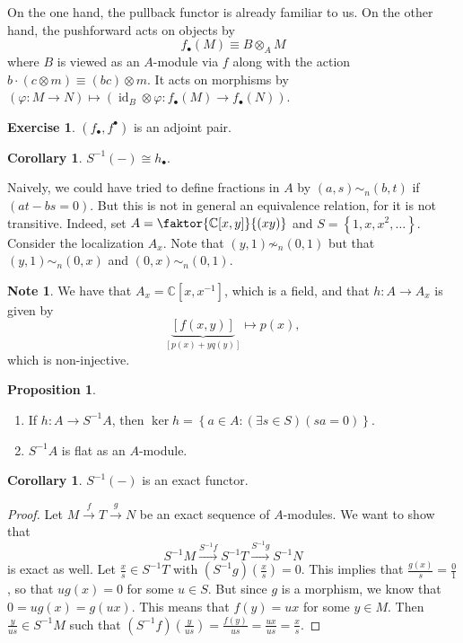 \documentclass[10pt,letterpaper,cm]{nupset}
\theoremstyle{definition}
\newtheorem{note}[definition]{Note}
\theoremstyle{theorem}
\newtheorem{prop}[definition]{Proposition}
\newtheorem{corollary}[definition]{Corollary}
\newtheorem{exercise}[definition]{Exercise}
\theoremstyle{remark}
\newcommand{\C}{\mathbb C}
\newcommand{\1}{\mathbf{1}}
\newcommand{\0}{\vec 0}
\DeclareMathOperator{\id}{id}
\begin{document}
On the one hand, the pullback functor is already familiar to us. On the other hand, the pushforward acts on objects by $$f_{\bullet}(M) \equiv B \otimes_A M$$ where $B$ is viewed as an $A$-module via $f$ along with the action $b\cdot(c \otimes m) \equiv  (bc) \otimes m$. It acts on morphisms by $\left(\varphi : M \to N\right) \mapsto \left(\id_B \otimes \varphi : f_{\bullet}(M) \to f_{\bullet}(N)\right)$. 


\begin{exercise}
$\left(f_{\bullet}, f^{\bullet}\right)$ is an adjoint pair.
\end{exercise}
\begin{corollary}
$S^{-1}(-) \cong h_{\bullet}$.
\end{corollary}

\smallskip

Naively, we could have tried to define fractions in $A$ by  $(a,s) \sim_n (b,t)$ if $(at-bs =0)$. But this is not in general an equivalence relation, for it is not transitive. Indeed, set $A = \faktor{\C[x,y]}{(xy)}$ and $S = \left\{1, x, x^2, \ldots\right\}$. Consider the localization $A_x$. Note that $(y,1) \not \sim_n (0,1)$ but that $(y,1) \sim_n (0,x)$ and $(0,x) \sim_n (0,1)$.

\begin{note}
We have that $A_x = \C[x,x^{-1}]$, which is a field, and that $h: A \to A_x$ is given by $$\underbrace{\left[f(x,y)\right]}_{\left[p(x) +yq(y)\right]} \mapsto p(x),$$ which is non-injective.
\end{note}

\begin{prop} $ $
\begin{enumerate}
\item If $h: A \to S^{-1}A$, then $\ker{h} = \left\{a\in A : \left(\exists s\in S\right)\left(sa = 0\right)\right\}$.
\item $S^{-1}A$ is flat as an $A$-module.
\end{enumerate}
\end{prop}

\begin{corollary}
$S^{-1}(-)$ is an exact functor.
\end{corollary}
\begin{proof}
Let $M \overset{f}{\longrightarrow} T \overset{g}{\longrightarrow} N$ be an exact sequence of $A$-modules. We want to show that $$S^{-1}M \overset{S^{-1}f}{\longrightarrow} S^{-1}T \overset{S^{-1}g}{\longrightarrow} S^{-1}N$$ is exact as well. Let $\frac{x}{s} \in S^{-1}T$ with $(S^{-1}g)\left(\frac{x}{s}\right) = 0$. This implies that $\frac{g(x)}{s} = \frac{0}{1}$, so that $ug(x) = 0$ for some $u\in S$. But since $g$ is a morphism, we know that $0 = ug(x) = g(ux)$. This means that $f(y) = ux$ for some $y\in M$. Then $\frac{y}{us}\in S^{-1}M$ such that $(S^{-1}f)\left(\frac{y}{us}\right) = \frac{f(y)}{us} = \frac{ux}{us} = \frac{x}{s}$.
\end{proof}
\end{document}
